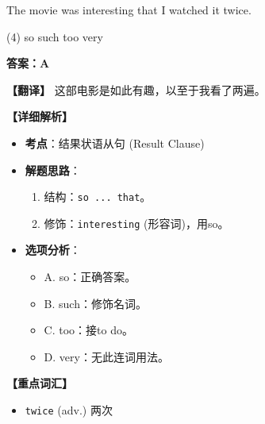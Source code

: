 \documentclass[11pt, a4paper]{article}
\newcommand{\analysis}[4]{
    \begin{solutionbox}
        \textbf{答案：#1}
        
        \textbf{【翻译】} #2
        
        \textbf{【详细解析】}
        #3
        
        \textbf{【重点词汇】}
        #4
    \end{solutionbox}
}
\newcommand{\blank}{\underline{\hspace{1.5cm}}}
\begin{document}
\begin{questions}
    \item The movie was \blank interesting that I watched it twice.
    \begin{tasks}(4)
        \task so \task such \task too \task very
    \end{tasks}
    \analysis{A}{这部电影是如此有趣，以至于我看了两遍。}{
        \begin{itemize}
            \item \textbf{考点}：结果状语从句 (Result Clause)
            \item \textbf{解题思路}：
                \begin{enumerate}
                    \item 结构：\texttt{so ... that}。
                    \item 修饰：\texttt{interesting} (形容词)，用so。
                \end{enumerate}
            \item \textbf{选项分析}：
                \begin{itemize}
                    \item A. so：正确答案。
                    \item B. such：修饰名词。
                    \item C. too：接to do。
                    \item D. very：无此连词用法。
                \end{itemize}
        \end{itemize}
    }{
        \begin{itemize}
            \item \texttt{twice} (adv.) 两次
        \end{itemize}
    }


\end{questions}
\end{document}
